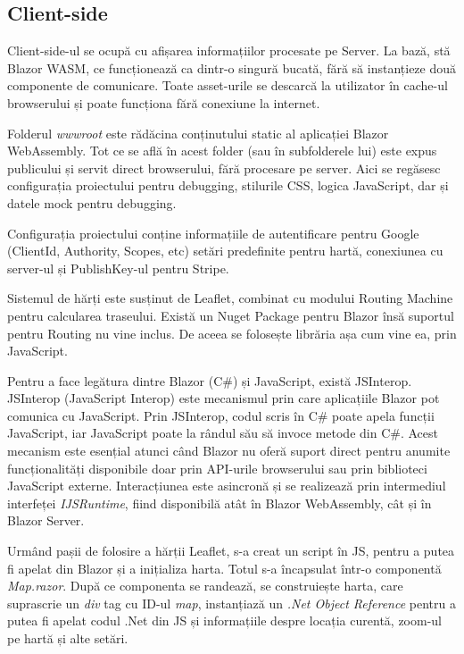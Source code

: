 \subsection{Client-side}

Client-side-ul se ocupă cu afișarea informațiilor procesate pe Server. La bază, stă
Blazor WASM, ce funcționează ca dintr-o singură bucată, fără să instanțieze
două componente de comunicare. Toate asset-urile se descarcă la utilizator
în cache-ul browserului și poate funcționa fără conexiune la internet.

Folderul \textit{wwwroot} este rădăcina conținutului static al aplicației Blazor WebAssembly. 
Tot ce se află în acest folder (sau în subfolderele lui) este expus publicului și servit direct browserului, fără procesare pe server.
Aici se regăsesc configurația proiectului pentru debugging, stilurile CSS, logica JavaScript, dar și datele mock pentru debugging.

Configurația proiectului conține informațiile de autentificare pentru Google (ClientId, Authority, Scopes, etc)
setări predefinite pentru hartă, conexiunea cu server-ul și PublishKey-ul pentru Stripe.

Sistemul de hărți este susținut de Leaflet, combinat cu modului Routing Machine pentru calcularea traseului.
Există un Nuget Package pentru Blazor însă suportul pentru Routing nu vine inclus. De aceea se folosește librăria așa
cum vine ea, prin JavaScript.

Pentru a face legătura dintre Blazor (C\#) și JavaScript, există JSInterop. JSInterop 
(JavaScript Interop) este mecanismul prin care aplicațiile Blazor pot comunica cu 
JavaScript. Prin JSInterop, codul scris în C\# poate apela funcții JavaScript, iar 
JavaScript poate la rândul său să invoce metode din C\#. Acest mecanism este esențial 
atunci când Blazor nu oferă suport direct pentru anumite funcționalități disponibile 
doar prin API-urile browserului sau prin biblioteci JavaScript externe. Interacțiunea 
este asincronă și se realizează prin intermediul interfeței \textit{IJSRuntime}, fiind 
disponibilă atât în Blazor WebAssembly, cât și în Blazor Server. \parencite{blazor} 

Urmând pașii de folosire a hărții Leaflet, s-a creat un script în JS, pentru a putea fi
apelat din Blazor și a inițializa harta. Totul s-a încapsulat într-o componentă \textit{Map.razor}.
După ce componenta se randează, se construiește harta, care suprascrie un \textit{div} tag cu ID-ul \textit{map}, instanțiază
un \textit{.Net Object Reference} pentru a putea fi apelat codul .Net din JS și informațiile despre locația curentă, zoom-ul 
pe hartă și alte setări.

